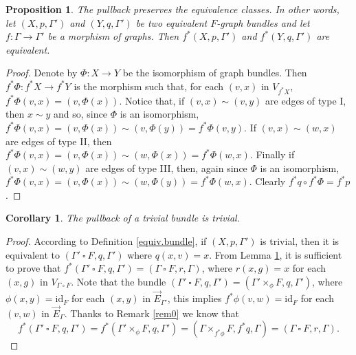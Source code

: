 \documentclass{amsart}
\newtheorem{prop}[theo]{Proposition}
\newtheorem{cor}[theo]{Corollary}
\theoremstyle{definition}
\numberwithin{equation}{section}
\begin{document}
\begin{prop}\label{lemma0}
The pullback preserves the equivalence classes. In other words, let $(X, p, \Gamma')$ and $(Y, q, \Gamma')$ be two equivalent $F$-graph bundles and let $f: \Gamma \longrightarrow \Gamma'$ be a morphism of graphs. Then $f^*(X, p, \Gamma')$ and $f^*(Y, q, \Gamma')$ are equivalent.
\end{prop}
\begin{proof}
Denote by $\Phi: X \longrightarrow Y$ be the isomorphism of graph bundles. Then
$f^*\Phi: f^*X \longrightarrow f^*Y$ is the morphism such that, for each $(v, x)$ in $V_{f^*X}$, $f^*\Phi(v,x) = (v, \Phi(x))$. Notice that, if $(v,x) \sim (v,y)$ are edges of type I, then $x\sim y$ and so, since $\Phi$ is an isomorphism, $f^*\Phi(v,x) = (v, \Phi(x)) \sim (v, \Phi(y)) = f^*\Phi(v,y)$.
If $(v,x) \sim (w,x)$ are edges of type II, then $f^*\Phi(v,x) = (v, \Phi(x)) \sim (w, \Phi(x)) = f^*\Phi(w,x)$. Finally if $(v,x) \sim (w,y)$ are edges of type III, then, again since $\Phi$ is an isomorphism, $f^*\Phi(v,x) = (v, \Phi(x)) \sim (w, \Phi(y)) = f^*\Phi(w,x)$. Clearly $f^*q \circ f^*\Phi = f^*p$.
\end{proof}
\begin{cor}\label{pulltrivial}
The pullback of a trivial bundle is trivial.    
\end{cor}
\begin{proof}
According to Definition \ref{equiv.bundle}, if $(X, p, \Gamma')$ is trivial, then it is equivalent to $(\Gamma' \ \square  \ F, q, \Gamma')$ where $q(x,v) = x$. From Lemma \ref{lemma0}, it is sufficient to prove that $f^*(\Gamma' \ \square  \ F, q, \Gamma') = (\Gamma \ \square  \ F, r, \Gamma)$, where $r(x,g) = x$ for each $(x,g)$ in $V_{\Gamma \ \square  \ F}$. Note that the bundle $(\Gamma' \ \square  \ F, q, \Gamma') = (\Gamma' \times_\phi F, q, \Gamma')$, where $\phi(x,y) = \mathrm{id}_F$ for each $(x,y)$ in $\vec{E}_{\Gamma'}$, this implies  $f^*\phi(v,w) = \mathrm{id}_{F}$ for each $(v,w)$ in $\vec{E}_{\Gamma}$. Thanks to Remark \ref{rem0} we know that
\begin{equation}
    f^*(\Gamma' \ \square  \  F, q, \Gamma') = f^*(\Gamma' \times_\phi F, q, \Gamma') = (\Gamma \times_{f^*\phi} F, f^* q, \Gamma) =  (\Gamma \ \square  \  F, r, \Gamma).
\end{equation}
\end{proof}
\end{document}
